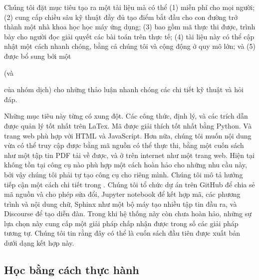 \documentclass[letterpaper,11pt,english]{sphinxmanual}
\begin{document}
Chúng tôi đặt mục tiêu tạo ra một tài liệu mà có thể (1) miễn phí cho
mọi người; (2) cung cấp chiều sâu kỹ thuật đầy đủ tạo điểm bắt đầu cho
con đường trở thành một nhà khoa học học máy ứng dụng; (3) bao gồm mã
thực thi được, trình bày cho người đọc  giải quyết các bài
toán trên thực tế; (4) tài liệu này có thể cập nhật một cách nhanh
chóng, bằng cả chúng tôi và cộng động ở quy mô lớn; và (5) được bổ sung
bởi một %
\begin{footnote}[18]\sphinxAtStartFootnote
{}
%
\end{footnote} (và %
\begin{footnote}[19]\sphinxAtStartFootnote
{}
%
\end{footnote} của nhóm dịch)
cho những thảo luận nhanh chóng các chi tiết kỹ thuật và hỏi đáp.



Những mục tiêu này từng có xung đột. Các công thức, định lý, và các
trích dẫn được quản lý tốt nhất trên LaTex. Mã được giải thích tốt nhất
bằng Python. Và trang web phù hợp với HTML và JavaScript. Hơn nữa, chúng
tôi muốn nội dung vừa có thể truy cập được bằng mã nguồn có thể thực
thi, bằng một cuốn sách như một tập tin PDF tải về được, và ở trên
internet như một trang web. Hiện tại không tồn tại công cụ nào phù hợp
một cách hoàn hảo cho những nhu cầu này, bởi vậy chúng tôi phải tự tạo
công cụ cho riêng mình. Chúng tôi mô tả hướng tiếp cận một cách chi tiết
trong . Chúng tôi tổ chức dự án trên
GitHub để chia sẻ mã nguồn và cho phép sửa đổi, Jupyter notebook để kết
hợp mã, các phương trình và nội dung chữ, Sphinx như một bộ máy tạo
nhiều tập tin đầu ra, và Discourse để tạo diễn đàn. Trong khi hệ thống
này còn chưa hoàn hảo, những sự lựa chọn này cung cấp một giải pháp chấp
nhận được trong số các giải pháp tương tự. Chúng tôi tin rằng đây có thể
là cuốn sách đầu tiên được xuất bản dưới dạng kết hợp này.








\subsection{Học bằng cách thực hành}
\label{\detokenize{chapter_preface/index_vn:hoc-bang-cach-thuc-hanh}}
\end{document}
